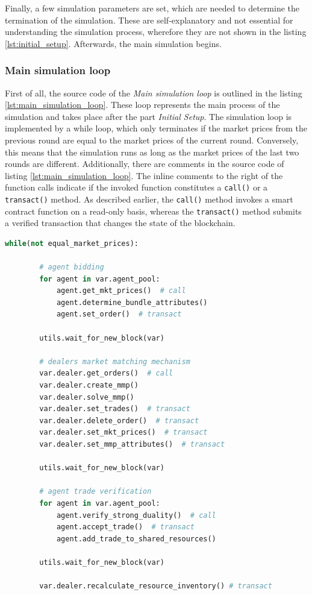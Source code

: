 Finally, a few simulation parameters are set, which are needed to determine the termination of the simulation.
These are self-explanatory and not essential for understanding the simulation process, wherefore they are not shown in the listing \ref{lst:initial_setup}.
Afterwards, the main simulation begins.

\subsubsection{Main simulation loop}
First of all, the source code of the \textit{Main simulation loop} is outlined in the listing \ref{lst:main_simulation_loop}.
These loop represents the main process of the simulation and takes place after the part \textit{Initial Setup}.
The simulation loop is implemented by a while loop, which only terminates if the 
market prices from the previous round are equal to the market prices of the current round.
Conversely, this means that the simulation runs as long as the market prices of the last two rounds are different.
Additionally, there are comments in the source code of listing \ref{lst:main_simulation_loop}.
The inline comments to the right of the function calls indicate if the invoked function constitutes
a \verb|call()| or a \verb|transact()| method. As described earlier, the \verb|call()| method invokes 
a smart contract function on a read-only basis, whereas the \verb|transact()| method submits a verified transaction 
that changes the state of the blockchain.

\begin{lstlisting}[float=htbp, label=lst:main_simulation_loop, caption=Main loop of the simulation, language=Python]
    while(not equal_market_prices):
        
        # agent bidding
        for agent in var.agent_pool:
            agent.get_mkt_prices()  # call
            agent.determine_bundle_attributes()
            agent.set_order()  # transact

        utils.wait_for_new_block(var)

        # dealers market matching mechanism
        var.dealer.get_orders()  # call
        var.dealer.create_mmp()
        var.dealer.solve_mmp()
        var.dealer.set_trades()  # transact
        var.dealer.delete_order()  # transact
        var.dealer.set_mkt_prices()  # transact
        var.dealer.set_mmp_attributes()  # transact

        utils.wait_for_new_block(var)

        # agent trade verification
        for agent in var.agent_pool:
            agent.verify_strong_duality()  # call
            agent.accept_trade()  # transact
            agent.add_trade_to_shared_resources()

        utils.wait_for_new_block(var)

        var.dealer.recalculate_resource_inventory() # transact        
\end{lstlisting}

